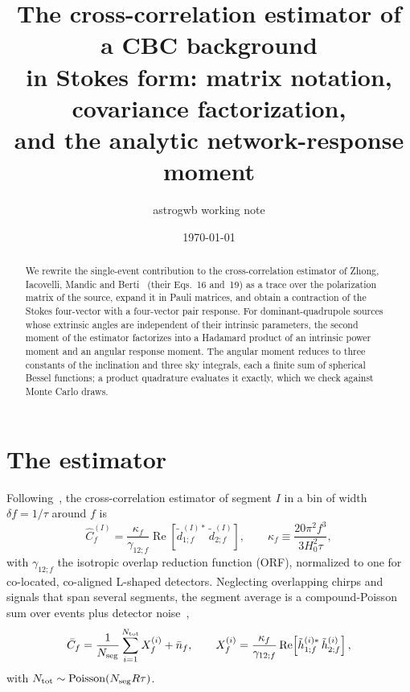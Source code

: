\documentclass[11pt]{article}
\title{The cross-correlation estimator of a CBC background\\
in Stokes form: matrix notation, covariance factorization,\\
and the analytic network-response moment}
\author{astrogwb working note}
\date{\today}
\renewcommand{\Re}{\operatorname{Re}}
\newcommand{\ft}[1]{\tilde{#1}}
\theoremstyle{remark}
\begin{document}
\maketitle

\begin{abstract}
We rewrite the single-event contribution to the cross-correlation estimator of
Zhong, Iacovelli, Mandic and Berti~\cite{Zhong2026} (their Eqs.~16 and~19) as a
trace over the polarization matrix of the source, expand it in Pauli matrices,
and obtain a contraction of the Stokes four-vector with a four-vector pair
response. For dominant-quadrupole sources whose extrinsic angles are independent
of their intrinsic parameters, the second moment of the estimator factorizes
into a Hadamard product of an intrinsic power moment and an angular response
moment. The angular moment reduces to three constants of the inclination and
three sky integrals, each a finite sum of spherical Bessel functions; a product
quadrature evaluates it exactly, which we check against Monte Carlo draws.
\end{abstract}

\section{The estimator}

Following~\cite{Zhong2026}, the cross-correlation estimator of segment $I$ in a
bin of width $\delta f = 1/\tau$ around $f$ is
\begin{equation}
  \hat C_f^{(I)} = \frac{\kappa_f}{\gamma_{12;f}}
  \Re\!\left[\ft d_{1;f}^{(I)*}\, \ft d_{2;f}^{(I)}\right],
  \qquad
  \kappa_f \equiv \frac{20\pi^2 f^3}{3 H_0^2 \tau},
  \label{eq:estimator}
\end{equation}
with $\gamma_{12;f}$ the isotropic overlap reduction function (ORF), normalized
to one for co-located, co-aligned L-shaped detectors. Neglecting overlapping
chirps and signals that span several segments, the segment average is a
compound-Poisson sum over events plus detector noise~\cite[Eq.~14]{Zhong2026},
\begin{equation}
  \bar C_f = \frac{1}{N_{\rm seg}} \sum_{i=1}^{N_{\rm tot}} X_f^{(i)}
  + \bar n_f,
  \qquad
  X_f^{(i)} = \frac{\kappa_f}{\gamma_{12;f}}
  \Re\!\left[\ft h_{1;f}^{(i)*}\, \ft h_{2;f}^{(i)}\right],
  \label{eq:compound}
\end{equation}
with $N_{\rm tot} \sim \mathrm{Poisson}(N_{\rm seg} R \tau)$.
\end{document}

